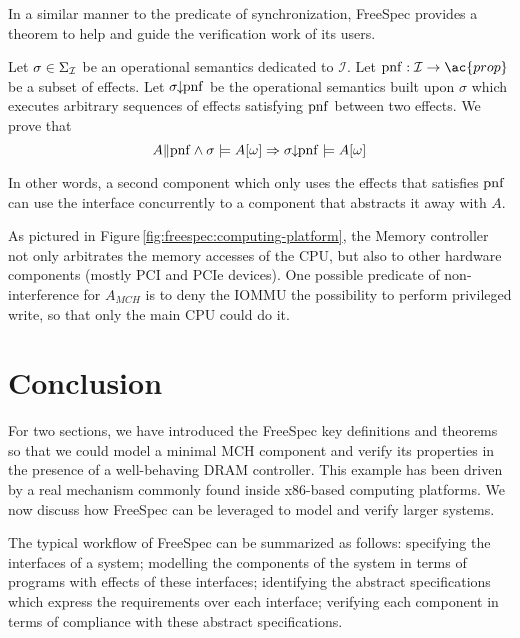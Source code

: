In a similar manner to the predicate of synchronization, FreeSpec provides a
theorem to help and guide the verification work of its users.

\begin{theorem}
  Let $\sigma \in \Sigma_{\mathcal{I}}$ be an operational semantics dedicated to
  $\mathcal{I}$. Let $\func{pnf} : \I \rightarrow \ac{prop}$ be a subset of
  effects. Let $\sigma\!\!\downarrow\!\!\mathrm{pnf}$ be the operational semantics
  built upon $\sigma$ which executes arbitrary sequences of effects satisfying
  $\mathrm{pnf}$ between two effects.  We prove that
  \[ A \| \mathrm{pnf} \wedge \sigma \models A[\omega] \Rightarrow
    \sigma\!\!\downarrow\!\!\mathrm{pnf} \models A[\omega]
  \]
\end{theorem}

In other words, a second component which only uses the effects that satisfies
$\mathrm{pnf}$ can use the interface concurrently to a component that abstracts it
away with $A$.

\begin{example}
  As pictured in Figure\,\ref{fig:freespec:computing-platform}, the Memory
  controller not only arbitrates the memory accesses of the CPU, but also to
  other hardware components (mostly PCI and PCIe devices).
  One possible predicate of non-interference for $A_{MCH}$ is to deny the IOMMU
  the possibility to perform privileged write, so that only the main CPU could
  do it.
\end{example}

\section{Conclusion}
\label{sec:freespec:scale}

For two sections, we have introduced the FreeSpec key definitions and theorems
so that we could model a minimal MCH component and verify its properties in the
presence of a well-behaving DRAM controller.
%
This example has been driven by a real mechanism commonly found inside x86-based
computing platforms.
%
We now discuss how FreeSpec can be leveraged to model and verify larger systems.

The typical workflow of FreeSpec can be summarized as follows: specifying the
interfaces of a system; modelling the components of the system in terms of
programs with effects of these interfaces; identifying the abstract
specifications which express the requirements over each interface; verifying
each component in terms of compliance with these abstract specifications.

